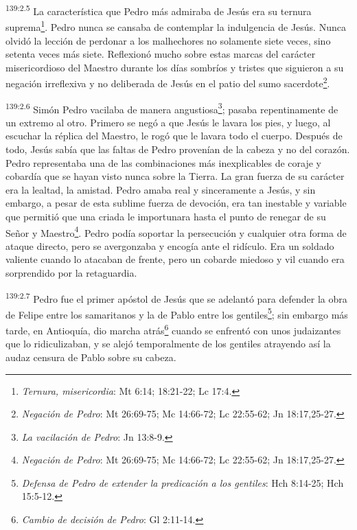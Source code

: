 \par 
\textsuperscript{139:2.5} La característica que Pedro más admiraba de Jesús era su ternura suprema\footnote{\textit{Ternura, misericordia}: Mt 6:14; 18:21-22; Lc 17:4.}. Pedro nunca se cansaba de contemplar la indulgencia de Jesús. Nunca olvidó la lección de perdonar a los malhechores no solamente siete veces, sino setenta veces más siete. Reflexionó mucho sobre estas marcas del carácter misericordioso del Maestro durante los días sombríos y tristes que siguieron a su negación irreflexiva y no deliberada de Jesús en el patio del sumo sacerdote\footnote{\textit{Negación de Pedro}: Mt 26:69-75; Mc 14:66-72; Lc 22:55-62; Jn 18:17,25-27.}.

\par 
\textsuperscript{139:2.6} Simón Pedro vacilaba de manera angustiosa\footnote{\textit{La vacilación de Pedro}: Jn 13:8-9.}; pasaba repentinamente de un extremo al otro. Primero se negó a que Jesús le lavara los pies, y luego, al escuchar la réplica del Maestro, le rogó que le lavara todo el cuerpo. Después de todo, Jesús sabía que las faltas de Pedro provenían de la cabeza y no del corazón. Pedro representaba una de las combinaciones más inexplicables de coraje y cobardía que se hayan visto nunca sobre la Tierra. La gran fuerza de su carácter era la lealtad, la amistad. Pedro amaba real y sinceramente a Jesús, y sin embargo, a pesar de esta sublime fuerza de devoción, era tan inestable y variable que permitió que una criada le importunara hasta el punto de renegar de su Señor y Maestro\footnote{\textit{Negación de Pedro}: Mt 26:69-75; Mc 14:66-72; Lc 22:55-62; Jn 18:17,25-27.}. Pedro podía soportar la persecución y cualquier otra forma de ataque directo, pero se avergonzaba y encogía ante el ridículo. Era un soldado valiente cuando lo atacaban de frente, pero un cobarde miedoso y vil cuando era sorprendido por la retaguardia.

\par 
\textsuperscript{139:2.7} Pedro fue el primer apóstol de Jesús que se adelantó para defender la obra de Felipe entre los samaritanos y la de Pablo entre los gentiles\footnote{\textit{Defensa de Pedro de extender la predicación a los gentiles}: Hch 8:14-25; Hch 15:5-12.}; sin embargo más tarde, en Antioquía, dio marcha atrás\footnote{\textit{Cambio de decisión de Pedro}: Gl 2:11-14.} cuando se enfrentó con unos judaizantes que lo ridiculizaban, y se alejó temporalmente de los gentiles atrayendo así la audaz censura de Pablo sobre su cabeza.

